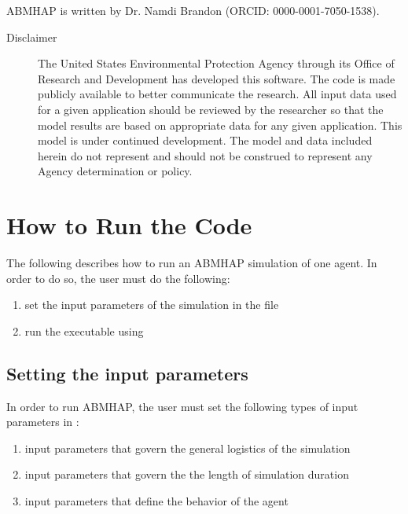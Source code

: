 \documentclass[letterpaper,10pt,english]{sphinxmanual}
\begin{document}
ABMHAP is written by Dr. Namdi Brandon (ORCID: 0000-0001-7050-1538).

\begin{DUlineblock}{0em}
\item[] 
\end{DUlineblock}
\begin{description}
\item[{Disclaimer}] \leavevmode
The United States Environmental Protection Agency through its Office of Research and Development has
developed this software. The code is made publicly available to better communicate the research. All
input data used for a given application should be reviewed by the researcher so that the model results
are based on appropriate data for any given application. This model is under continued development. The
model and data included herein do not represent and should not be construed to represent any Agency
determination or policy.

\end{description}


\chapter{How to Run the Code}
\label{index:welcome-to-the-documentation-for-the-agent-based-model-of-human-activity-patterns-abmhap}\label{index:how-to-run-the-code}
The following describes how to run an ABMHAP simulation of one agent. In order to do so, the user must
do the following:
\begin{enumerate}
\item {} 
set the input parameters of the simulation in the file 

\item {} 
run the executable using 

\end{enumerate}


\section{Setting the input parameters}
\label{index:setting-the-input-parameters}
In order to run ABMHAP, the user must set the following types of input parameters in
:
\begin{enumerate}
\item {} 
input parameters that govern the general logistics of the simulation

\item {} 
input parameters that govern the the length of simulation duration

\item {} 
input parameters that define the behavior of the agent

\end{enumerate}
\end{document}
